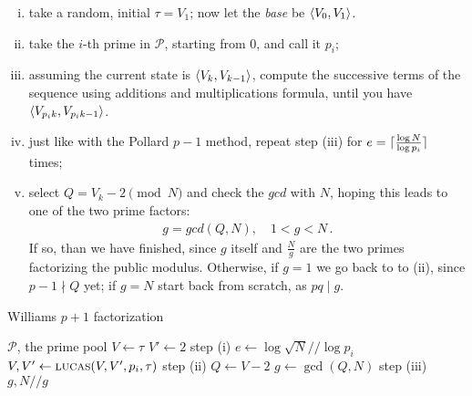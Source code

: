 \begin{enumerate}[(i)]
\item take a random, initial $\tau = V_1$; now let the \emph{base} be
  $\langle V_0, V_1\rangle$.
\item take the $i$-th prime in $\mathcal{P}$, starting from $0$, and call it
  $p_i$;
\item assuming the current state is $\langle V_k, V_{k-1}\rangle$, compute the
  successive terms of the sequence using additions and multiplications formula,
  until you have $\langle V_{p_ik}, V_{p_ik - 1}\rangle$.
\item just like with the Pollard $p-1$ method, repeat step (iii) for $e =
  \lceil\frac{\log N}{\log p_i}\rceil$ times;
\item select $Q = V_k - 2 \pmod{N}$ and check the $gcd$ with $N$, hoping this
  leads to one of the two prime factors:
\begin{align}
  g = gcd(Q, N), \quad 1 < g < N \,.
\end{align}
If so, than we have finished, since $g$ itself and $\frac{N}{g}$
are the two primes factorizing the public  modulus.
Otherwise, if $g = 1$ we go back to to (ii), since $p-1 \nmid Q$ yet;
if $g = N$ start back from scratch, as $pq \mid g$.

\end{enumerate}



\begin{algorithm}
  \caption{Williams $p+1$ factorization}
  \begin{algorithmic}[1]
    \Require $\mathcal{P}$, the prime pool
      \State $V \gets \tau$
      \State $V' \gets 2$
      \Comment step (i)
        \State $e \gets \log \sqrt{N} // \log p_i$
          \State $V, V' \gets \textsc{lucas}(V, V', p_i, \tau)$
          \Comment step (ii)
          \State $Q \gets V -2$
          \State $g \gets \gcd(Q, N)$
          \Comment step (iii)
           \Return {}
           \Return $g, N//g$
          \EndIf
        \EndFor
      \EndFor
    \EndFunction
  \end{algorithmic}
\end{algorithm}
